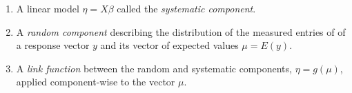 \documentclass[convert={density=300,outext=.png}]{standalone}
\begin{document}
\begin{minipage}[t]{0.8\textwidth}
\begin{enumerate}
\item A linear model $\eta = X\beta$ called the {\it systematic component}.
\item A \emph{random component} describing the distribution of the
measured entries of of a response vector $y$ and its vector of
expected values $\mu = E(y)$.
\item  A \emph{link function} between the random and systematic components,
$\eta = g(\mu)$, applied component-wise to the vector $\mu$.
\end{enumerate}
\end{minipage}
\end{document}
